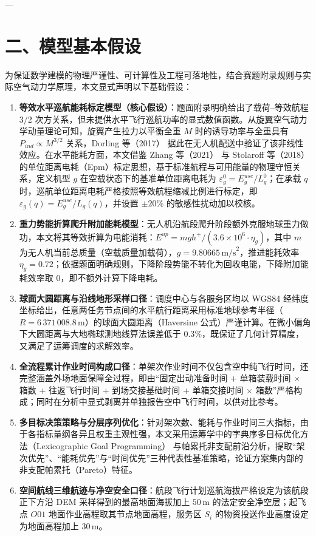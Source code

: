 \documentclass[12pt,a4paper,UTF8]{ctexart}
\begin{document}
---

\section{二、模型基本假设}

为保证数学建模的物理严谨性、可计算性及工程可落地性，结合赛题附录规则与实际空气动力学原理，本文显式声明以下基础假设：

\begin{enumerate}[label=\textbf{假设 \arabic*：}, leftmargin=*]
    \item \textbf{等效水平巡航能耗标定模型（核心假设）}：题面附录明确给出了载荷--等效航程 $3/2$ 次方关系，但未提供水平飞行巡航功率的显式数值函数。从旋翼空气动力学动量理论可知，旋翼产生拉力以平衡全重 $M$ 时的诱导功率与全重具有 $P_{ind} \propto M^{3/2}$ 关系\cite{leishman2006}，Dorling 等（2017）\cite{dorling2017} 据此在无人机配送中验证了该非线性效应。在水平能耗方面，本文借鉴 Zhang 等（2021）\cite{zhang2021} 与 Stolaroff 等（2018）\cite{stolaroff2018} 的单位距离电耗（Epm）标定思想，基于标准航程与可用能量的物理守恒关系，定义机型 $g$ 在空载状态下的基准单位距离电耗为 $\varepsilon_g^0 = E_g^{use} / L_g^0$；在承载 $q$ 时，巡航单位距离电耗严格按照等效航程缩减比例进行标定，即 $\varepsilon_g(q) = E_g^{use} / L_g(q)$，并设置 $\pm 20\%$ 的敏感性扰动加以校核。
    \item \textbf{重力势能折算爬升附加能耗模型}：无人机沿航段爬升阶段额外克服地球重力做功，本文将其等效折算为电能消耗：$E^{up} = m g h^+ / (3.6 \times 10^6 \cdot \eta_g)$，其中 $m$ 为无人机当前总质量（空载质量加载荷），$g = 9.80665\,\text{m/s}^2$，推进能耗效率 $\eta_g = 0.72$；依据题面明确规则，下降阶段势能不转化为回收电能，下降附加能耗效率取 0，即不额外计算下降电耗。
    \item \textbf{球面大圆距离与沿线地形采样口径}：调度中心与各服务区均以 WGS84 经纬度坐标给出，任意两任务节点间的水平航行距离采用标准地球参考半径（$R = 6\,371\,008.8\,\text{m}$）的球面大圆距离（Haversine 公式）严谨计算\cite{sinnott1984}。在微小偏角下大圆距离与大地椭球测地线算法\cite{vincenty1975}误差低于 $0.3\%$，既保证了几何计算精度，又满足了运筹调度的求解效率。
    \item \textbf{全流程累计作业时间构成口径}：单架次作业时间不仅包含空中纯飞行时间，还完整涵盖外场地面保障全过程\cite{liu2017}，即由“固定出动准备时间 + 单箱装载时间 $\times$ 箱数 + 往返飞行时间 + 到场交接基础时间 + 单箱交接时间 $\times$ 箱数”严格构成；同时在分析中显式剥离并单独报告空中飞行时间，以供对比参考。
    \item \textbf{多目标决策策略与分层序列优化}：针对架次数、能耗与作业时间三大指标，由于各指标量纲各异且权重主观性强，本文采用运筹学中的字典序多目标优化方法（Lexicographic Goal Programming）\cite{ehrgott2005} 与帕累托非支配前沿分析\cite{marler2004}，提取“架次优先”、“能耗优先”与“时间优先”三种代表性基准策略，论证方案集内部的非支配帕累托（Pareto）特征。
    \item \textbf{空间航线三维航迹与净空安全口径}：航段飞行计划巡航海拔严格设定为该航段正下方沿 DEM 采样得到的最高地面海拔加上 $50\,\text{m}$ 的法定安全净空层；起飞点 $O01$ 地面作业高程取其节点地面高程，服务区 $S_i$ 的物资投送作业高度设定为地面高程加上 $30\,\text{m}$。
\end{enumerate}
\end{document}
